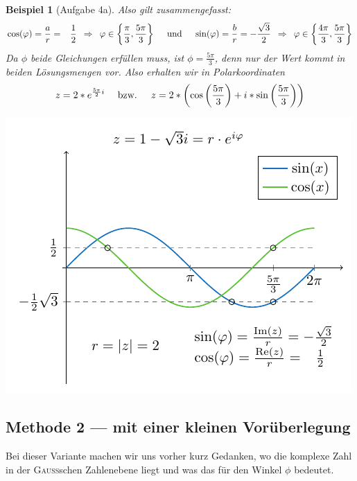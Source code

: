 \documentclass[ngerman, a4paper, 11pt]{article}
\theoremstyle{nonumberplain}
\newtheorem{beispiel}{Beispiel}
\renewcommand{\i}{i}
\begin{document}
\begin{beispiel}[Aufgabe 4a]
		Also gilt zusammengefasst:
		\begin{equation*}
			\cos(\varphi) = \frac{a}{r} = \phantom{-}\frac{1}{2} \enskip \Rightarrow \enskip \varphi \in \left\{ \frac{\pi}{3}, \frac{5\pi}{3} \right\} 
			\quad \text{ und } \quad
			\sin(\varphi) = \frac{b}{r}  = -\frac{\sqrt{3}}{2} \enskip \Rightarrow \enskip \varphi \in \left\{ \frac{4\pi}{3}, \frac{5\pi}{3} \right\}
		\end{equation*}
		Da $\phi$ beide Gleichungen erfüllen muss, ist $\phi = \frac{5\pi}{3}$, denn nur der Wert kommt in beiden Lösungsmengen vor.
		Also erhalten wir in Polarkoordinaten
		\begin{equation*}
			z = 2 * e^{\frac{5\pi}{2} \i} 
			\quad \text{ bzw. } \quad 
			z = 2 * \brackets{\cos\brackets{\frac{5\pi}{3}} + \i * \sin\brackets{\frac{5\pi}{3}}}
		\end{equation*}

		\begin{center}
			\includegraphics[scale=1]{aufgabe4a-i-bild1}
		\end{center}
	\end{beispiel}

	\pagebreak
	
	\subsection*{Methode 2 --- mit einer kleinen Vorüberlegung}
	Bei dieser Variante machen wir uns vorher kurz Gedanken, wo die komplexe Zahl in der \textsc{Gauß}schen Zahlenebene liegt und was das für den Winkel $\phi$ bedeutet. 
	
\end{document}
